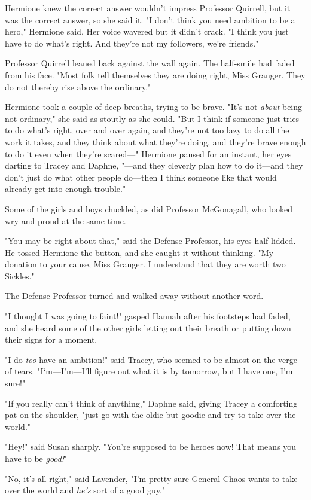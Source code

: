 Hermione knew the correct answer wouldn't impress Professor Quirrell, but it 
was the correct answer, so she said it. "I don't think you need ambition to be 
a hero," Hermione said. Her voice wavered but it didn't crack. "I think you 
just have to do what's right. And they're not my followers, we're friends."

Professor Quirrell leaned back against the wall again. The half-smile had faded 
from his face. "Most folk tell themselves they are doing right, Miss Granger. 
They do not thereby rise above the ordinary."

Hermione took a couple of deep breaths, trying to be brave. "It's not 
\emph{about} being not ordinary," she said as stoutly as she could. "But I 
think if someone just tries to do what's right, over and over again, and 
they're not too lazy to do all the work it takes, and they think about what 
they're doing, and they're brave enough to do it even when they're scared---" 
Hermione paused for an instant, her eyes darting to Tracey and Daphne, "---and 
they cleverly plan how to do it---and they don't just do what other people 
do---then I think someone like that would already get into enough trouble."

Some of the girls and boys chuckled, as did Professor McGonagall, who looked 
wry and proud at the same time.

"You may be right about that," said the Defense Professor, his eyes 
half-lidded. He tossed Hermione the button, and she caught it without thinking. 
"My donation to your cause, Miss Granger. I understand that they are worth two 
Sickles."

The Defense Professor turned and walked away without another word.

"I thought I was going to faint!" gasped Hannah after his footsteps had faded, 
and she heard some of the other girls letting out their breath or putting down 
their signs for a moment.

"I do \emph{too} have an ambition!" said Tracey, who seemed to be almost on the 
verge of tears. "I`m---I'm---I'll figure out what it is by tomorrow, but I have 
one, I'm sure!"

"If you really can't think of anything," Daphne said, giving Tracey a 
comforting pat on the shoulder, "just go with the oldie but goodie and try to 
take over the world."

"Hey!" said Susan sharply. "You're supposed to be heroes now! That means you 
have to be \emph{good!}"

"No, it's all right," said Lavender, "I'm pretty sure General Chaos wants to 
take over the world and \emph{he's} sort of a good guy."

